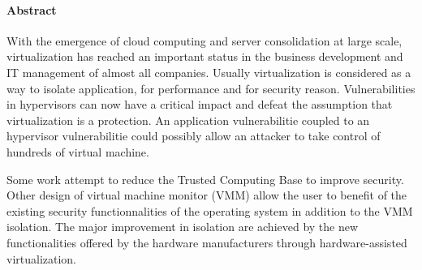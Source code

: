 \paragraph{Abstract}
With the emergence of cloud computing and server consolidation at large scale,
virtualization has reached an important status in the business development and IT management
of almost all companies.
Usually virtualization is considered as a way to isolate application, for
performance and for security reason.
Vulnerabilities in hypervisors can now have a critical impact and defeat
the assumption that virtualization is a protection.
An application vulnerabilitie coupled to an hypervisor vulnerabilitie could
possibly allow an attacker to take control of hundreds of virtual machine.

Some work attempt to reduce the Trusted Computing Base to improve security.
Other design of virtual machine monitor (VMM) allow the user to benefit of the
existing security functionnalities of the operating system in addition to the
VMM isolation.
The major improvement in isolation are achieved by the new functionalities
offered by the hardware manufacturers through hardware-assisted virtualization.
